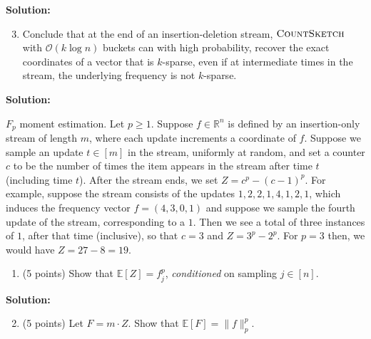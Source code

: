 \documentclass[11pt]{article}
\newcommand{\Ex}[1]{\ensuremath{\mathbb{E}\left[#1\right]}}
\newcommand{\CountSketch}{\textsc{CountSketch}}
\begin{document}
\noindent\textbf{Solution:}






\begin{enumerate}
\setcounter{enumi}{2}
\item
Conclude that at the end of an insertion-deletion stream, $\CountSketch$ with $\mathcal{O}(k\log n)$ buckets can with high probability, recover the exact coordinates of a vector that is $k$-sparse, even if at intermediate times in the stream, the underlying frequency is not $k$-sparse.
\end{enumerate}

\noindent\textbf{Solution:}














\newpage\noindent
$F_p$ moment estimation. 
\vskip 0.1in\noindent
Let $p\ge 1$. 
Suppose $f\in\mathbb{R}^n$ is defined by an insertion-only stream of length $m$, where each update increments a coordinate of $f$. 
Suppose we sample an update $t\in[m]$ in the stream, uniformly at random, and set a counter $c$ to be the number of times the item appears in the stream after time $t$ (including time $t$). 
After the stream ends, we set $Z=c^p-(c-1)^p$. 
\vskip 0.1in\noindent
For example, suppose the stream consists of the updates $1,2,2,1,4,1,2,1$, which induces the frequency vector $f=(4,3,0,1)$ and suppose we sample the fourth update of the stream, corresponding to a $1$. 
Then we see a total of three instances of $1$, after that time (inclusive), so that $c=3$ and $Z=3^p-2^p$. 
For $p=3$ then, we would have $Z=27-8=19$. 
\begin{enumerate}
\item (5 points)
Show that $\Ex{Z}=f_j^p$, \emph{conditioned} on sampling $j\in[n]$.
\end{enumerate}

\noindent\textbf{Solution:}


\begin{enumerate}
\setcounter{enumi}{1}
\item (5 points)
Let $F=m\cdot Z$. 
Show that $\Ex{F}=\|f\|_p^p$. 
\end{enumerate}
\end{document}
